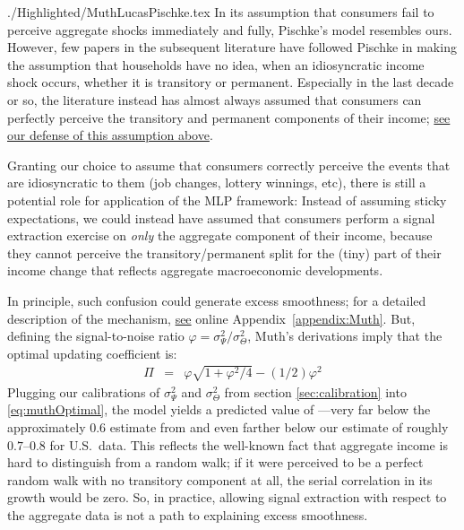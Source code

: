 \documentclass[titlepage]{./econtex}
\begin{document}
\begin{verbatimwrite}{./Highlighted/MuthLucasPischke.tex}
In its assumption that consumers fail to perceive aggregate shocks immediately and fully, Pischke's model resembles ours.  However, few papers in the subsequent literature have followed Pischke in making the assumption that households have no idea, when an idiosyncratic income shock occurs, whether it is transitory or permanent.  Especially in the last decade or so, the literature instead has almost always assumed that consumers can perfectly perceive the transitory and permanent components of their income; \hyperlink{Why-Consumers-See-Individual-Shocks}{see our defense of this assumption above}.

Granting our choice to assume that consumers correctly perceive the events that are idiosyncratic to them (job changes, lottery winnings, etc), there is still a potential role for application of the MLP framework:  Instead of assuming sticky expectations, we could instead have assumed that consumers perform a signal extraction exercise on \textit{only} the aggregate component of their income, because they cannot perceive the transitory/permanent split for the (tiny) part of their income change that reflects aggregate macroeconomic developments.

In principle, such confusion could generate excess smoothness; for a detailed description of the mechanism, \hyperlink{MuthLucasPischke}{see} online Appendix~\ref{appendix:Muth}.  But, defining the signal-to-noise ratio $\varphi=\sigma^2_{\Psi}/\sigma^2_{\Theta}$, Muth's derivations imply that the optimal updating coefficient is:
  \begin{eqnarray}
\Pi & = & \varphi \sqrt{1+\varphi^{2}/4} - (1/2) \varphi^{2} \label{eq:muthOptimal}
  \end{eqnarray}
Plugging our calibrations of $\sigma^2_{\Psi}$ and $\sigma^2_{\Theta}$ from section \ref{sec:calibration} into \eqref{eq:muthOptimal}, the model yields a predicted value of ---very far below the approximately $0.6$ estimate from \cite{hrsHabit} and even farther below our estimate of roughly $0.7$--$0.8$ for U.S.\ data.  This reflects the well-known fact that aggregate income is hard to distinguish from a random walk; if it were perceived to be a perfect random walk with no transitory component at all, the serial correlation in its growth would be zero.  So, in practice, allowing signal extraction with respect to the aggregate data is not a path to explaining excess smoothness.


\end{verbatimwrite}
\end{document}
